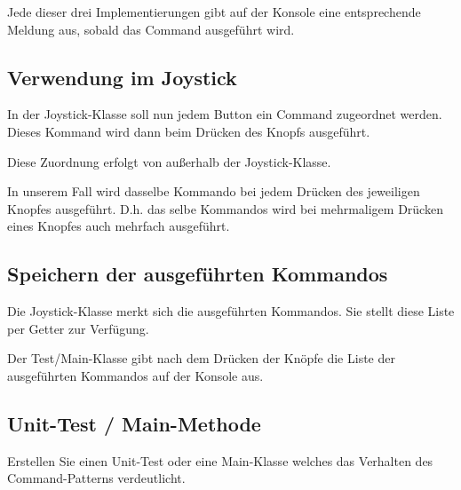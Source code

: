 \documentclass[oneside,a4paper]{scrartcl}
\begin{document}
Jede dieser drei Implementierungen gibt auf der Konsole eine entsprechende Meldung aus, sobald das
Command ausgeführt wird.


\subsection{Verwendung im Joystick}
In der Joystick-Klasse soll nun jedem Button ein Command zugeordnet werden.
Dieses Kommand wird dann beim Drücken des Knopfs ausgeführt.

Diese Zuordnung erfolgt von außerhalb der Joystick-Klasse.

In unserem Fall wird dasselbe Kommando bei jedem Drücken des jeweiligen Knopfes ausgeführt. D.h.
das selbe Kommandos wird bei mehrmaligem Drücken eines Knopfes auch mehrfach ausgeführt.

\subsection{Speichern der ausgeführten Kommandos}

Die Joystick-Klasse merkt sich die ausgeführten Kommandos. Sie stellt diese Liste per Getter zur Verfügung.

Der Test/Main-Klasse gibt nach dem Drücken der Knöpfe die Liste der ausgeführten Kommandos auf der Konsole
aus.


\subsection{Unit-Test / Main-Methode}
Erstellen Sie einen Unit-Test oder eine Main-Klasse welches das Verhalten des Command-Patterns verdeutlicht.
\end{document}
